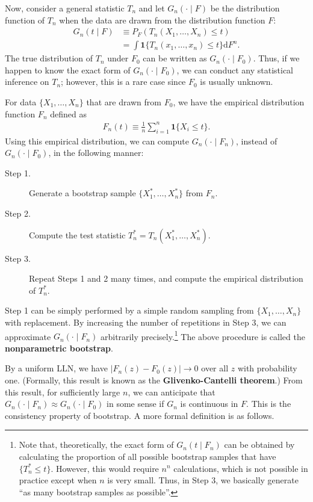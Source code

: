 \documentclass[11pt, A4paper, openany, uplatex]{book}
\begin{document}
Now, consider a general statistic $T_n$ and let $G_n(\cdot \mid F)$ be the distribution function of $T_n$ when the data are drawn from the distribution function $F$:
\begin{align*}
	G_n(t \mid F) 
	& \equiv P_F(T_n(X_1, \ldots, X_n) \le t) \\
	& = \int \mathbf{1}\{T_n(x_1, \ldots, x_n) \le t\} \mathrm{d} F^n.
\end{align*}
The true distribution of $T_n$ under $F_0$ can be written as $G_n(\cdot \mid F_0)$.
Thus, if we happen to know the exact form of $G_n(\cdot \mid F_0)$, we can conduct any statistical inference on $T_n$; however, this is a rare case since $F_0$ is usually unknown.

For data $\{X_1, \ldots, X_n\}$ that are drawn from $F_0$, we have the empirical distribution function $F_n$ defined as
\begin{align*}
	F_n(t) \equiv \frac{1}{n}\sum_{i = 1}^n \mathbf{1}\{X_i \le t\}.
\end{align*} 
Using this empirical distribution, we can compute $G_n(\cdot \mid F_n)$, instead of $G_n(\cdot \mid F_0)$, in the following manner:
\begin{description}
	\item[Step 1.] Generate a bootstrap sample $\{X_1^*, \dots, X_n^*\}$ from $F_n$. 
	\item[Step 2.] Compute the test statistic $T_n^* = T_n(X_1^*, \dots, X_n^*)$.
	\item[Step 3.] Repeat Steps 1 and 2 many times, and compute the empirical distribution of $T_n^*$. 
\end{description}
Step 1 can be simply performed by a simple random sampling from $\{X_1, \ldots, X_n\}$ with replacement.
By increasing the number of repetitions in Step 3, we can approximate $G_n(\cdot \mid F_n)$ arbitrarily precisely.\footnote{
	Note that, theoretically, the exact form of $G_n(t \mid F_n)$ can be obtained by calculating the proportion of all possible bootstrap samples that have $\{T_n^* \le t\}$.
	However, this would require $n^n$ calculations, which is not possible in practice except when $n$ is very small.
	Thus, in Step 3, we basically generate ``as many bootstrap samples as possible''.
}
The above procedure is called the \textbf{nonparametric bootstrap}.

By a uniform LLN, we have $|F_n(z) - F_0(z)| \to 0$ over all $z$ with probability one.
(Formally, this result is known as the \textbf{Glivenko-Cantelli theorem}.)
From this result,  for sufficiently large $n$, we can anticipate that $G_n(\cdot \mid F_n) \approx G_n(\cdot \mid F_0)$ in some sense if $G_n$ is continuous in $F$.
This is the consistency property of bootstrap.
A more formal definition is as follows.
\end{document}

